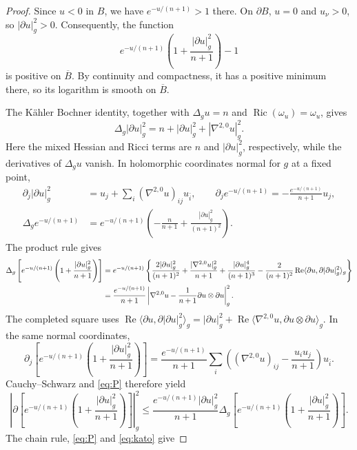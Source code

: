 \documentclass[11pt]{article}
\newcommand{\Ric}{\operatorname{Ric}}
\begin{document}
\begin{proof}
Since $u<0$ in $B$, we have $e^{-u/(n+1)}>1$ there. On
$\partial B$, $u=0$ and $u_\nu>0$, so $|\partial u|_g^2>0$.
Consequently, the function
$$
 e^{-u/(n+1)}\left(1+\frac{|\partial u|_g^2}{n+1}\right)-1
$$
is positive on $\overline B$. By continuity and compactness, it
has a positive minimum there, so its logarithm is smooth on
$\overline B$.

The K\"ahler Bochner identity, together with $\Delta_gu=n$ and
$\Ric(\omega_u)=\omega_u$, gives
$$
 \Delta_g|\partial u|_g^2=n+|\partial u|_g^2+|\nabla^{2,0}u|_g^2.
$$
Here the mixed Hessian and Ricci terms are $n$ and
$|\partial u|_g^2$, respectively, while the derivatives of
$\Delta_gu$ vanish. In holomorphic coordinates normal for $g$
at a fixed point,
\begin{align*}
 \partial_j|\partial u|_g^2&=u_j+\sum_i(\nabla^{2,0}u)_{ij}u_{\bar i},\qquad
 \partial_je^{-u/(n+1)}=-\frac{e^{-u/(n+1)}}{n+1}u_j,\\
 \Delta_ge^{-u/(n+1)}&=e^{-u/(n+1)}
 \left(-\frac n{n+1}+\frac{|\partial u|_g^2}{(n+1)^2}\right).
\end{align*}
The product rule gives
{\small
\begin{align}
 \Delta_g\left[e^{-u/(n+1)}\left(1+\frac{|\partial u|_g^2}{n+1}\right)\right]
 &=e^{-u/(n+1)}\left\{\frac{2|\partial u|_g^2}{(n+1)^2}
 +\frac{|\nabla^{2,0}u|_g^2}{n+1}
 +\frac{|\partial u|_g^4}{(n+1)^3}-\frac2{(n+1)^2}\operatorname{Re}
 \langle\partial u,\partial|\partial u|_g^2\rangle_g\right\}\notag\\
 &=\frac{e^{-u/(n+1)}}{n+1}\left|\nabla^{2,0}u-\frac1{n+1}\partial u\otimes\partial u\right|_g^2.\label{eq:P}
\end{align}}
The completed square uses
$ \operatorname{Re}\langle\partial u,\partial|\partial u|_g^2\rangle_g
 =|\partial u|_g^2+\operatorname{Re}
 \langle\nabla^{2,0}u,\partial u\otimes\partial u\rangle_g.$
In the same normal coordinates,
$$
 \partial_j\left[e^{-u/(n+1)}\left(1+\frac{|\partial u|_g^2}{n+1}\right)\right]
 =\frac{e^{-u/(n+1)}}{n+1}\sum_i
 \left((\nabla^{2,0}u)_{ij}-\frac{u_i u_j}{n+1}\right)u_{\bar i}.
$$
Cauchy--Schwarz and \eqref{eq:P} therefore yield
\begin{equation}\label{eq:kato}
 \left|\partial\left[e^{-u/(n+1)}\left(1+\frac{|\partial u|_g^2}{n+1}\right)\right]\right|_g^2
 \le\frac{e^{-u/(n+1)}|\partial u|_g^2}{n+1}
       \Delta_g\left[e^{-u/(n+1)}\left(1+\frac{|\partial u|_g^2}{n+1}\right)\right].
\end{equation}
The chain rule, \eqref{eq:P} and \eqref{eq:kato} give

\end{proof}
\end{document}
